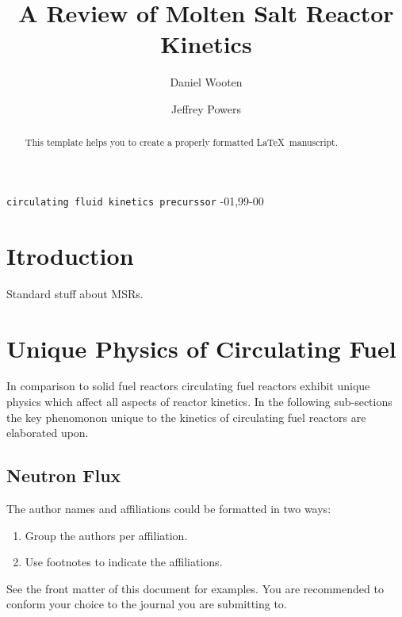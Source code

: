 \documentclass[review]{elsarticle}
\begin{document}
\begin{frontmatter}

\title{A Review of Molten Salt Reactor Kinetics}

\author{Daniel Wooten}
\address{4155 Etcheverry Hall, MC 1730, University of California, Berkeley,
    Berkeley, CA 94720-1730}

\author{Jeffrey Powers}
\address{Oak Ridge}

\begin{abstract}
This template helps you to create a properly formatted \LaTeX\ manuscript.
\end{abstract}

\begin{keyword}
\texttt{circulating fluid kinetics precurssor}
-01\sep  99-00
\end{keyword}

\end{frontmatter}

\linenumbers

\section{Itroduction} \label{introduction}
Standard stuff about MSRs.

\section{Unique Physics of Circulating Fuel} 
In comparison to solid fuel reactors circulating fuel reactors exhibit unique
physics which affect all aspects of reactor kinetics. In the following
sub-sections the key phenomonon unique to the kinetics of circulating fuel
reactors are elaborated upon.

\subsection{Neutron Flux} 


The author names and affiliations could be formatted in two ways:
\begin{enumerate}[(1)]
\item Group the authors per affiliation.
\item Use footnotes to indicate the affiliations.
\end{enumerate}
See the front matter of this document for examples. You are recommended to conform your choice to the journal you are submitting to.
\end{document}
